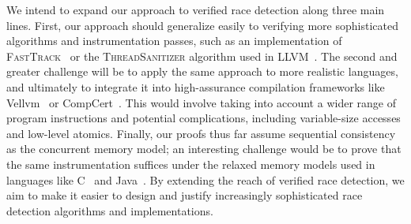 \documentclass[preprint, 9pt]{sigplanconf}
\newcommand{\FT}{\textsc{FastTrack}\xspace}
\begin{document}
We intend to expand our approach to verified race detection along three main lines. First, our approach should generalize easily to verifying more sophisticated algorithms and instrumentation passes, such as an implementation of \FT~\cite{fasttrack} or the \textsc{ThreadSanitizer} algorithm used in LLVM~\cite{serebryany_threadsanitizer:_2009}. The second and greater challenge will be to apply the same approach to more realistic languages, and ultimately to integrate it into high-assurance compilation frameworks like Vellvm~\cite{vellvm} or CompCert~\cite{compcert}. This would involve taking into account a wider range of program instructions and potential complications, including variable-size accesses and low-level atomics. Finally, our proofs thus far assume sequential consistency as the concurrent memory model; an interesting challenge would be to prove that the same instrumentation suffices under the relaxed memory models used in languages like C~\cite{boehm_foundations_2008} and Java~\cite{manson_java_2005}. By extending the reach of verified race detection, we aim to make it easier to design and justify increasingly sophisticated race detection algorithms and implementations.




\end{document}
